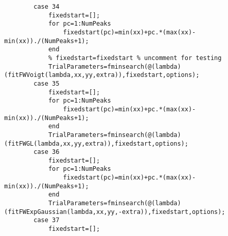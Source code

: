 \begin{lstlisting}
        case 34
            fixedstart=[];
            for pc=1:NumPeaks
                fixedstart(pc)=min(xx)+pc.*(max(xx)-min(xx))./(NumPeaks+1);
            end  
            % fixedstart=fixedstart % uncomment for testing
            TrialParameters=fminsearch(@(lambda)(fitFWVoigt(lambda,xx,yy,extra)),fixedstart,options);
        case 35
            fixedstart=[];
            for pc=1:NumPeaks
                fixedstart(pc)=min(xx)+pc.*(max(xx)-min(xx))./(NumPeaks+1);
            end            
            TrialParameters=fminsearch(@(lambda)(fitFWGL(lambda,xx,yy,extra)),fixedstart,options);
        case 36
            fixedstart=[];
            for pc=1:NumPeaks
                fixedstart(pc)=min(xx)+pc.*(max(xx)-min(xx))./(NumPeaks+1);
            end
            TrialParameters=fminsearch(@(lambda)(fitFWExpGaussian(lambda,xx,yy,-extra)),fixedstart,options);
        case 37
            fixedstart=[];


\end{lstlisting}
